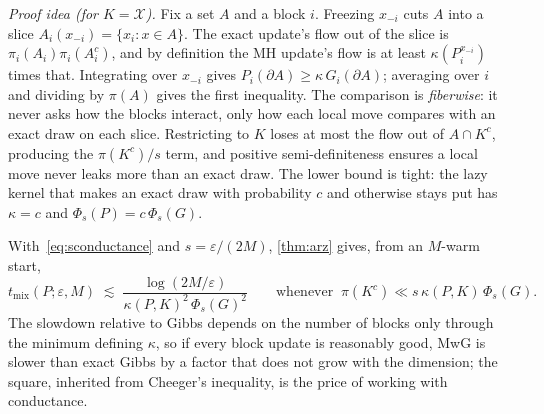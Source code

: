 \documentclass[11pt]{article}
\theoremstyle{remark}
\newcommand{\X}{\mathcal{X}}
\newcommand{\tmix}{t_{\mathrm{mix}}}
\begin{document}
\emph{Proof idea (for $K=\X$).} Fix a set $A$ and a block $i$. Freezing $x_{-i}$ cuts $A$ into a slice $A_i(x_{-i})=\{x_i:x\in A\}$. The exact update's flow out of the slice is $\pi_i(A_i)\pi_i(A_i^c)$, and by definition the MH update's flow is at least $\kappa(P_i^{x_{-i}})$ times that. Integrating over $x_{-i}$ gives $P_i(\partial A)\ge\kappa\,G_i(\partial A)$; averaging over $i$ and dividing by $\pi(A)$ gives the first inequality. The comparison is \emph{fiberwise}: it never asks how the blocks interact, only how each local move compares with an exact draw on each slice. Restricting to $K$ loses at most the flow out of $A\cap K^c$, producing the $\pi(K^c)/s$ term, and positive semi-definiteness ensures a local move never leaks more than an exact draw. The lower bound is tight: the lazy kernel that makes an exact draw with probability $c$ and otherwise stays put has $\kappa=c$ and $\Phi_s(P)=c\,\Phi_s(G)$.

With~\eqref{eq:sconductance} and $s=\varepsilon/(2M)$, \cref{thm:arz} gives, from an $M$-warm start,
\[
\tmix(P;\varepsilon,M)\;\lesssim\;\frac{\log(2M/\varepsilon)}{\kappa(P,K)^2\,\Phi_s(G)^2}\qquad\text{whenever }\ \pi(K^c)\ll s\,\kappa(P,K)\,\Phi_s(G).
\]
The slowdown relative to Gibbs depends on the number of blocks only through the minimum defining $\kappa$, so if every block update is reasonably good, MwG is slower than exact Gibbs by a factor that does not grow with the dimension; the square, inherited from Cheeger's inequality, is the price of working with conductance.
\end{document}
